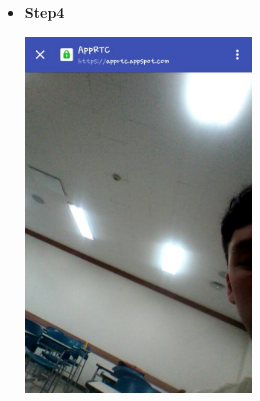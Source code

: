 \documentclass[12pt]{article}
\begin{document}
\begin{itemize}
\item\textbf{Step4}\\
\begin{center} 
\includegraphics[width=60mm,scale=1]{streamingstep4}
\end{center}
\end{itemize}
\newpage
\end{document}
